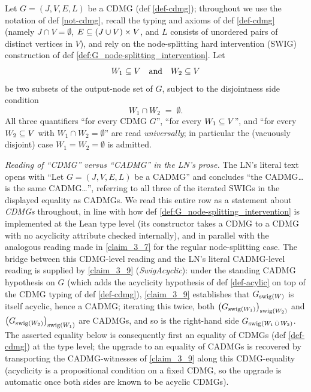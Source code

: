 \documentclass[main]{subfiles}
\begin{document}
\begin{Lem}
    Let $G = (J, V, E, L)$ be a CDMG (def \ref{def-cdmg}); throughout we use the notation of def \ref{not-cdmg}, recall the typing and axioms of def \ref{def-cdmg} (namely $J \cap V = \emptyset$, $E \subseteq (J \cup V) \times V$, and $L$ consists of unordered pairs of distinct vertices in $V$), and rely on the node-splitting hard intervention (SWIG) construction of def \ref{def:G_node-splitting_intervention}. Let
    \[ W_1 \subseteq V \quad\text{and}\quad W_2 \subseteq V \]
    be two subsets of the output-node set of $G$, subject to the disjointness side condition
    \[ W_1 \cap W_2 \;=\; \emptyset. \]
    All three quantifiers ``for every CDMG $G$'', ``for every $W_1 \subseteq V$'', and ``for every $W_2 \subseteq V$ with $W_1 \cap W_2 = \emptyset$'' are read \emph{universally}; in particular the (vacuously disjoint) case $W_1 = W_2 = \emptyset$ is admitted.

    \emph{Reading of ``CDMG'' versus ``CADMG'' in the LN's prose.}
    The LN's literal text opens with ``Let $G = (J, V, E, L)$ be a CADMG'' and concludes ``the CADMG\ldots is the same CADMG\ldots'', referring to all three of the iterated SWIGs in the displayed equality as CADMGs. We read this entire row as a statement about \emph{CDMGs} throughout, in line with how def \ref{def:G_node-splitting_intervention} is implemented at the Lean type level (its constructor takes a CDMG to a CDMG with no acyclicity attribute checked internally), and in parallel with the analogous reading made in \ref{claim_3_7} for the regular node-splitting case. The bridge between this CDMG-level reading and the LN's literal CADMG-level reading is supplied by \ref{claim_3_9} (\emph{SwigAcyclic}): under the standing CADMG hypothesis on $G$ (which adds the acyclicity hypothesis of def \ref{def-acylic} on top of the CDMG typing of def \ref{def-cdmg}), \ref{claim_3_9} establishes that $G_{\mathrm{swig}(W)}$ is itself acyclic, hence a CADMG; iterating this twice, both $\left ( G_{\mathrm{swig}(W_1)} \right )_{\mathrm{swig}(W_2)}$ and $\left ( G_{\mathrm{swig}(W_2)} \right )_{\mathrm{swig}(W_1)}$ are CADMGs, and so is the right-hand side $G_{\mathrm{swig}(W_1 \,\dot{\cup}\, W_2)}$. The asserted equality below is consequently first an equality of CDMGs (def \ref{def-cdmg}) at the type level; the upgrade to an equality of CADMGs is recovered by transporting the CADMG-witnesses of \ref{claim_3_9} along this CDMG-equality (acyclicity is a propositional condition on a fixed CDMG, so the upgrade is automatic once both sides are known to be acyclic CDMGs).


\end{Lem}
\end{document}
